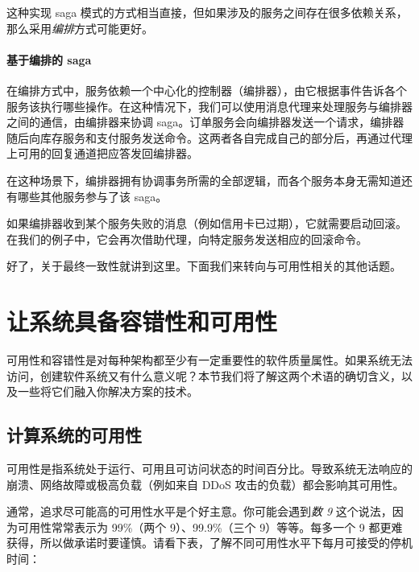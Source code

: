 这种实现 saga 模式的方式相当直接，但如果涉及的服务之间存在很多依赖关系，那么采用\emph{编排}方式可能更好。

\paragraph{基于编排的 saga}

\label{idx:306}
在编排方式中，服务依赖一个中心化的控制器（编排器），由它根据事件告诉各个服务该执行哪些操作。在这种情况下，我们可以使用消息代理来处理服务与编排器之间的通信，由编排器来协调 saga。订单服务会向编排器发送一个请求，编排器随后向库存服务和支付服务发送命令。这两者各自完成自己的部分后，再通过代理上可用的回复通道把应答发回编排器。

在这种场景下，编排器拥有协调事务所需的全部逻辑，而各个服务本身无需知道还有哪些其他服务参与了该 saga。

如果编排器收到某个服务失败的消息（例如信用卡已过期），它就需要启动回滚。在我们的例子中，它会再次借助代理，向特定服务发送相应的回滚命令。


\label{idx:307}
好了，关于最终一致性就讲到这里。下面我们来转向与可用性相关的其他话题。

\section{让系统具备容错性和可用性}

\label{idx:308}
可用性和容错性是对每种架构都至少有一定重要性的软件质量属性。如果系统无法访问，创建软件系统又有什么意义呢？本节我们将了解这两个术语的确切含义，以及一些将它们融入你解决方案的技术。

\subsection{计算系统的可用性}

\label{idx:309}
可用性是指系统处于运行、可用且可访问状态的时间百分比。导致系统无法响应的崩溃、网络故障或极高负载（例如来自 DDoS 攻击的负载）都会影响其可用性。

通常，追求尽可能高的可用性水平是个好主意。你可能会遇到\emph{数 9} 这个说法，因为可用性常常表示为 99\%（两个 9）、99.9\%（三个 9）等等。每多一个 9 都更难获得，所以做承诺时要谨慎。请看下表，了解不同可用性水平下每月可接受的停机时间：

